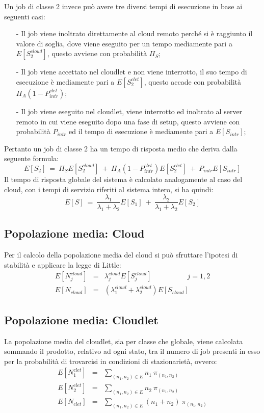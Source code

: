 Un job di classe 2 invece può avere tre diversi tempi di esecuzione in base ai
seguenti casi:
\begin{itemize}
\item[-]Il job viene inoltrato direttamente al cloud remoto perché si è
raggiunto il valore di soglia, dove viene eseguito per un tempo mediamente pari
a $E[S_2^{cloud}]$, questo avviene con probabilità $\Pi_S$;
\item[-]Il job viene accettato nel cloudlet e non viene interrotto, il suo tempo
di esecuzione è mediamente pari a $E[S_2^{clet}]$, questo accade con probabilità
$\Pi_A (1 - P_{intr}^{clet})$;
\item[-]Il job viene eseguito nel cloudlet, viene interrotto ed inoltrato al
server remoto in cui viene eseguito dopo una fase di setup, questo avviene con
probabilità $P_{intr}$ ed il tempo di esecuzione è mediamente pari a 
$E[S_{intr}]$; 
\end{itemize}
Pertanto un job di classe 2 ha un tempo di risposta medio che deriva dalla
seguente formula:
\begin{equation}
E[S_2] \ = \
\Pi_S E[S_2^{cloud}] \ + \ \Pi_A (1-P_{intr}^{clet}) E[S_2^{clet}] \ + \ 
P_{intr} E[S_{intr}]
\end{equation}
Il tempo di risposta globale del sistema è calcolato analogamente al caso del
cloud, con i tempi di servizio riferiti al sistema intero, si ha quindi:
\begin{equation}
E[S] \ = \
\frac{\lambda_1}{\lambda_1+\lambda_2}  E[S_1] \ + \
\frac{\lambda_2}{\lambda_1+\lambda_2}  E[S_2] 
\end{equation}
%
%
\subsection{Popolazione media: Cloud}
Per il calcolo della popolazione media del cloud si può sfruttare l'ipotesi di
stabilità e applicare la legge di Little:
\begin{eqnarray}
E[N_j^{cloud}] &=& \lambda_j^{cloud} E[S_j^{cloud}]  \qquad\quad\qquad j=1,2 \\
E[N_{cloud}] &=& (\lambda_1^{cloud} + \lambda_2^{cloud}) E[S_{cloud}]
\end{eqnarray}
%
\subsection{Popolazione media: Cloudlet}
La popolazione media del cloudlet, sia per classe che globale, viene calcolata
sommando il prodotto, relativo ad ogni stato, tra il numero di job presenti in
esso per la probabilità di trovarcisi in condizioni di stazionarietà, ovvero:
\begin{eqnarray}
E[N_1^{clet}] &=& \sum_{(n_1,n_2) \in E} n_1 \ \pi_{(n_1,n_2)} \\
E[N_2^{clet}] &=& \sum_{(n_1,n_2) \in E} n_2 \ \pi_{(n_1,n_2)} \\
E[N_{clet}] &=& \sum_{(n_1,n_2) \in E} (n_1+n_2) \ \pi_{(n_1,n_2)} 
\end{eqnarray}
%

